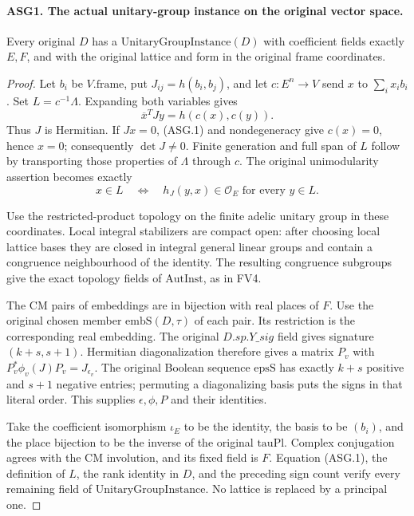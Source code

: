 \paragraph{ASG1. The actual unitary-group instance on the original vector space.}
\label{claim:ASG1}
Every original \(D\) has a \(\mathrm{UnitaryGroupInstance}(D)\)
with coefficient fields exactly \(E,F\), and with the original lattice
and form in the original frame coordinates.
\begin{proof}
Let \(b_i\) be \(V.\mathrm{frame}\), put
\(J_{ij}=h(b_i,b_j)\), and let
\(c:E^n\longrightarrow V\) send \(x\) to \(\sum_i x_i b_i\).
Set \(L=c^{-1}\Lambda\).  Expanding both variables gives
\[
                 \overline{x}^{T}Jy=h(c(x),c(y)).
\tag{ASG.1}
\]
Thus \(J\) is Hermitian.  If \(Jx=0\), (ASG.1) and
nondegeneracy give \(c(x)=0\), hence \(x=0\); consequently
\(\det J\ne0\).  Finite generation and full span of \(L\)
follow by transporting those properties of \(\Lambda\) through
\(c\).  The original unimodularity assertion becomes exactly
\[
 x\in L\quad\Longleftrightarrow\quad
       h_J(y,x)\in\mathcal O_E\text{ for every }y\in L.
\tag{ASG.2}
\]

Use the restricted-product topology on the finite adelic unitary group
in these coordinates.  Local integral stabilizers are compact open:
after choosing local lattice bases they are closed in integral general
linear groups and contain a congruence neighbourhood of the identity.
The resulting congruence subgroups give the exact topology fields of
\(\mathrm{AutInst}\), as in FV4.

The CM pairs of embeddings are in bijection with real places of \(F\).
Use the original chosen member \(\mathrm{embS}(D,\tau)\) of each
pair.  Its restriction is the corresponding real embedding.  The
original \(D.sp.Y\_sig\) field gives signature
\((k+s,s+1)\).  Hermitian diagonalization therefore gives a matrix
\(P_v\) with
\(P_v^*\phi_v(J)P_v=J_{\epsilon_v}\).
The original Boolean sequence \(\mathrm{epsS}\) has exactly
\(k+s\) positive and \(s+1\) negative entries; permuting a
diagonalizing basis puts the signs in that literal order.
This supplies \(\epsilon,\phi,P\) and their identities.

Take the coefficient isomorphism \(\iota_E\) to be the identity,
the basis to be \((b_i)\), and the place bijection to be the inverse
of the original \(\mathrm{tauPl}\).  Complex conjugation agrees
with the CM involution, and its fixed field is \(F\).
Equation (ASG.1), the definition of \(L\), the rank identity in
\(D\), and the preceding sign count verify every remaining field
of \(\mathrm{UnitaryGroupInstance}\).  No lattice is replaced
by a principal one.
\end{proof}

